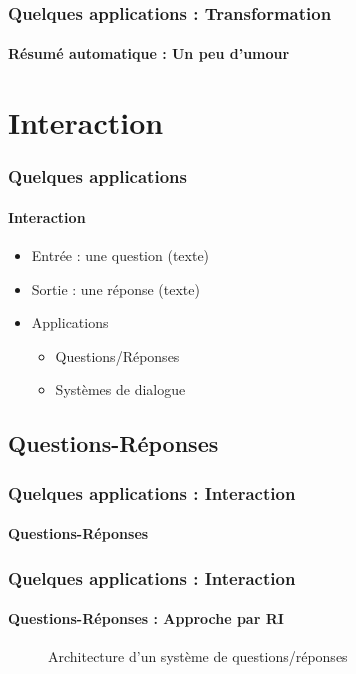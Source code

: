 \documentclass[xcolor=table]{beamer}
\begin{document}
\begin{frame}
	\frametitle{Quelques applications : Transformation}
	\framesubtitle{Résumé automatique : Un peu d'umour}
	
	\begin{center}
	\end{center}
	
\end{frame}

\section{Interaction}

\begin{frame}
	\frametitle{Quelques applications}
	\framesubtitle{Interaction}
	\begin{itemize}
		\item Entrée : une question (texte)
		\item Sortie : une réponse (texte)
		\item Applications 
		\begin{itemize}
			\item Questions/Réponses
			\item Systèmes de dialogue
		\end{itemize}
	\end{itemize}
\end{frame}

\subsection{Questions-Réponses}

\begin{frame}
	\frametitle{Quelques applications : Interaction}
	\framesubtitle{Questions-Réponses}
\end{frame}

\begin{frame}
	\frametitle{Quelques applications : Interaction}
	\framesubtitle{Questions-Réponses : Approche par RI}
	
	\begin{figure}
		\caption{Architecture d'un système de questions/réponses \cite{2019-jurafsky-martin}}
	\end{figure}
	
\end{frame}
\end{document}
